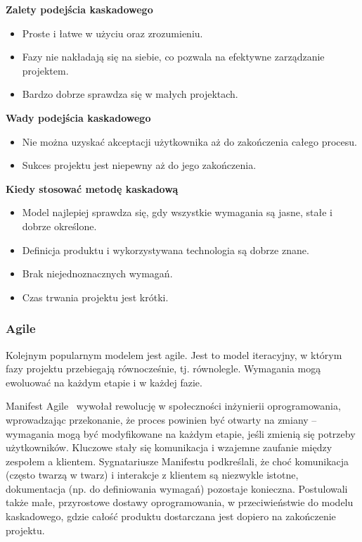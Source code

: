 \textbf{Zalety podejścia kaskadowego}
\begin{itemize}
    \item Proste i łatwe w użyciu oraz zrozumieniu.
    \item Fazy nie nakładają się na siebie, co pozwala na efektywne zarządzanie projektem.
    \item Bardzo dobrze sprawdza się w małych projektach.
\end{itemize}

\textbf{Wady podejścia kaskadowego}
\begin{itemize}
    \item Nie można uzyskać akceptacji użytkownika aż do zakończenia całego procesu.
    \item Sukces projektu jest niepewny aż do jego zakończenia.
\end{itemize}

\textbf{Kiedy stosować metodę kaskadową}
\begin{itemize}
    \item Model najlepiej sprawdza się, gdy wszystkie wymagania są jasne, stałe i dobrze określone.
    \item Definicja produktu i wykorzystywana technologia są dobrze znane.
    \item Brak niejednoznacznych wymagań.
    \item Czas trwania projektu jest krótki.\autocite{arora2016analysis}
\end{itemize}

\subsubsection{Agile}

Kolejnym popularnym modelem jest agile. Jest to model iteracyjny, w którym fazy projektu przebiegają równocześnie, tj. równolegle. Wymagania mogą ewoluować na każdym etapie i w każdej fazie.\autocite{arora2016analysis}

Manifest Agile~\autocite{agileManifesto} wywołał rewolucję w społeczności inżynierii oprogramowania, wprowadzając przekonanie, że proces powinien być otwarty na zmiany – wymagania mogą być modyfikowane na każdym etapie, jeśli zmienią się potrzeby użytkowników. Kluczowe stały się komunikacja i wzajemne zaufanie między zespołem a klientem. Sygnatariusze Manifestu podkreślali, że choć komunikacja (często twarzą w twarz) i interakcje z klientem są niezwykle istotne, dokumentacja (np. do definiowania wymagań) pozostaje konieczna. Postulowali także małe, przyrostowe dostawy oprogramowania, w przeciwieństwie do modelu kaskadowego, gdzie całość produktu dostarczana jest dopiero na zakończenie projektu.\autocite{swebok}

